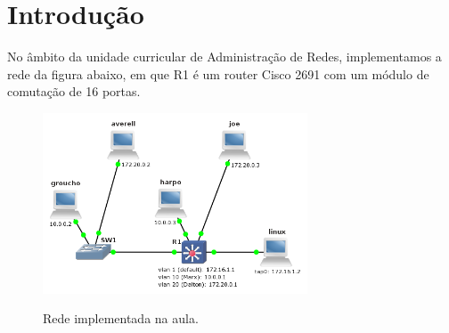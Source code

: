 \section*{Introdução}

No âmbito da unidade curricular de Administração de Redes, implementamos a rede da figura abaixo, em que R1 é um router Cisco 2691 com um módulo de comutação de 16 portas.\\

\begin{figure}[h]
\centering
\includegraphics[width=0.7\textwidth, height=0.3\textheight]{rede.png}
\label{fig:rede}
\caption{Rede implementada na aula.}
\end{figure}

\newpage